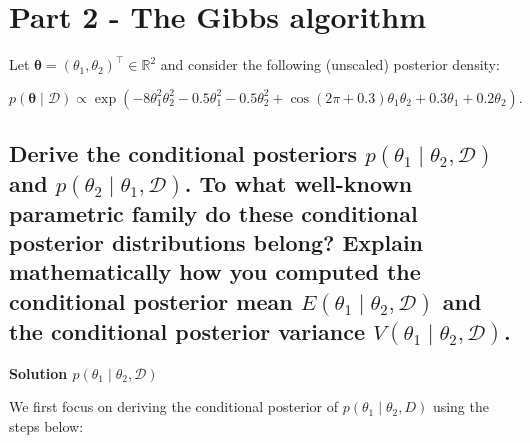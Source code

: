 \documentclass[12pt]{article}
\begin{document}
\newpage
\section{Part 2 - The Gibbs algorithm}
Let \(\boldsymbol{\theta} = (\theta_1, \theta_2)^\top \in \mathbb{R}^2\) and consider the following (unscaled) posterior density:

\[
p(\boldsymbol{\theta} \mid \mathcal{D}) \propto \exp\left(-8\theta_1^2\theta_2^2 - 0.5\theta_1^2 - 0.5\theta_2^2 + \cos(2\pi + 0.3)\theta_1\theta_2 + 0.3\theta_1 + 0.2\theta_2 \right).
\]

\subsection{Derive the conditional posteriors \(p(\theta_1 \mid \theta_2, \mathcal{D})\) and \(p(\theta_2 \mid \theta_1, \mathcal{D})\). To what well-known parametric family do these conditional posterior distributions belong? Explain mathematically how you computed the conditional posterior mean \(E(\theta_1 \mid \theta_2, \mathcal{D})\) and the conditional posterior variance \(V(\theta_1 \mid \theta_2, \mathcal{D})\).} 
\textbf{Solution \(p(\theta_1 \mid \theta_2, \mathcal{D})\) }{\label{theta1}}

We first focus on deriving the conditional posterior of  \(p(\theta_1 \mid \theta_2, D)\) using the steps below:
\end{document}

